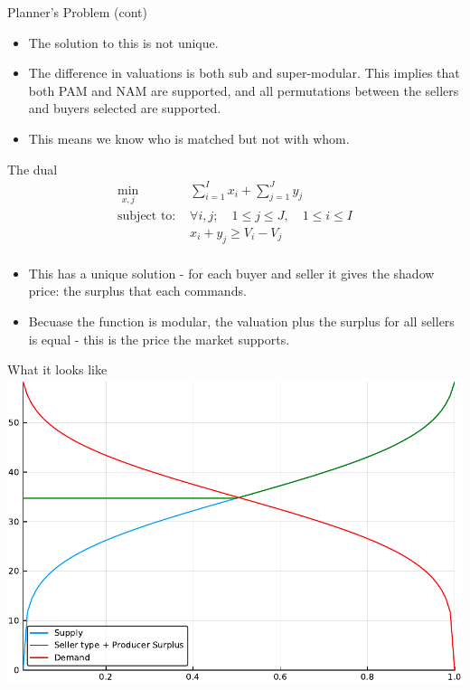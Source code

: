 \documentclass[bigger]{beamer}
\begin{document}
\begin{frame}[label=sec-1-5]{Planner's Problem (cont)}
\begin{itemize}
\item The solution to this is not unique.
\item The difference in valuations is both sub and super-modular. This
implies that both PAM and NAM are supported, and all permutations
between the sellers and buyers selected are supported.
\item This means we know who is matched but not with whom.
\end{itemize}
\end{frame}

\begin{frame}[label=sec-1-6]{The dual}
\begin{align*}
\min_{x,j} & \sum_{i=1}^I x_i + \sum_{j=1}^J y_j \\
\text{subject to: } & \forall i,j; \quad 1 \leq j \leq J, \quad 1 \le i \leq I\\
& x_i + y_j \geq V_i - V_j \\ 
\end{align*}

\begin{itemize}
\item This has a unique solution - for each buyer and seller it gives the
shadow price: the surplus that each commands.
\item Becuase the function is modular, the valuation plus the surplus for
all sellers is equal - this is the price the market supports.
\end{itemize}
\end{frame}

\begin{frame}[label=sec-1-7]{What it looks like}
\includegraphics[width=.9\linewidth]{../Scripts/evenStevens.pdf}
\end{frame}
\end{document}
